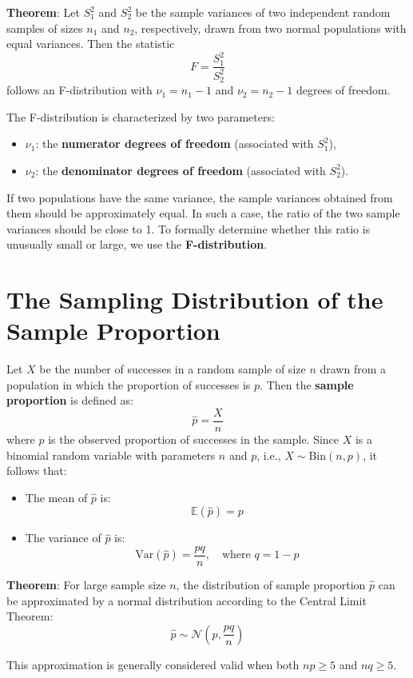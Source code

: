 \documentclass[twoside]{book}
\begin{document}
\begin{textbox}
\textbf{Theorem}: Let \( S_1^2 \) and \( S_2^2 \) be the sample variances of two independent random samples of sizes \( n_1 \) and \( n_2 \), respectively, drawn from two normal populations with equal variances. Then the statistic
\[
F = \frac{S_1^2}{S_2^2}
\]
follows an F-distribution with \( \nu_1 = n_1 - 1 \) and \( \nu_2 = n_2 - 1 \) degrees of freedom.
\end{textbox}

The F-distribution is characterized by two parameters:
\begin{itemize}
    \item \( \nu_1 \): the \textbf{numerator degrees of freedom} (associated with \( S_1^2 \)),
    \item \( \nu_2 \): the \textbf{denominator degrees of freedom} (associated with \( S_2^2 \)).
\end{itemize}

If two populations have the same variance, the sample variances obtained from them should be approximately equal. In such a case, the ratio of the two sample variances should be close to 1. To formally determine whether this ratio is unusually small or large, we use the \textbf{F-distribution}.


\section{The Sampling Distribution of the Sample Proportion}

Let \( X \) be the number of successes in a random sample of size \( n \) drawn from a population in which the proportion of successes is \( p \). Then the \textbf{sample proportion} is defined as:
\[
\hat{p} = \frac{X}{n}
\]
where \( \hat{p} \) is the observed proportion of successes in the sample. Since \( X \) is a binomial random variable with parameters \( n \) and \( p \), i.e., \( X \sim \text{Bin}(n, p) \), it follows that:
\begin{itemize}
    \item The mean of \( \hat{p} \) is:
    \[
    \mathbb{E}\left( \hat{p}\right)  = p
    \]
    \item The variance of \( \hat{p} \) is:
    \[
    \text{Var}(\hat{p}) = \frac{pq}{n}, \quad \text{where } q = 1 - p
    \]
\end{itemize}

\begin{textbox}
    \textbf{Theorem}: For large sample size \( n \), the distribution of sample proportion \( \hat{p} \) can be approximated by a normal distribution according to the Central Limit Theorem:
    \[
    \hat{p} \sim \mathcal{N}\left(p, \frac{pq}{n}\right)
    \]
\end{textbox}
This approximation is generally considered valid when both \( np \geq 5 \) and \( nq \geq 5 \).
\end{document}
